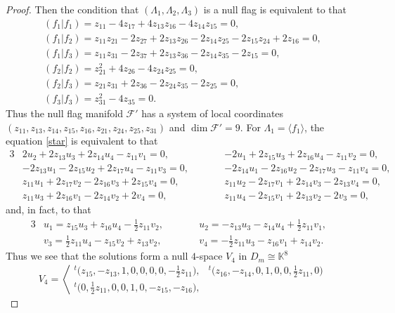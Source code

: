 \documentclass[11pt]{article}
\numberwithin{equation}{section}
\numberwithin{equation}{section}
\theoremstyle{definition}
\newcommand{\KK}{\mathbb{K}}
\newcommand{\0}{\boldsymbol{0}}
\begin{document}
\begin{proof}
Then the condition that $(\Lambda_1, \Lambda_2, \Lambda_3)$ is a null flag is equivalent to that
\begin{gather*}
(f_1 \vert f_1) = z_{11} - 4z_{17} + 4z_{13}z_{16} - 4z_{14}z_{15} = 0,
\\
(f_1 \vert f_2) = z_{11}z_{21} - 2z_{27} + 2z_{13}z_{26} - 2z_{14}z_{25} - 2z_{15}z_{24} + 2z_{16} = 0,
\\
(f_1 \vert f_3) = z_{11}z_{31} - 2z_{37} + 2z_{13}z_{36} - 2z_{14}z_{35} - 2z_{15} = 0,
\\
(f_2 \vert f_2) = z_{21}^2 + 4z_{26} - 4z_{24}z_{25} = 0,
\\
(f_2 \vert f_3) = z_{21}z_{31} + 2z_{36} - 2z_{24}z_{35} - 2z_{25} = 0,
\\
(f_3 \vert f_3) = z_{31}^2 - 4z_{35} = 0.
\end{gather*}
Thus the null flag manifold ${\mathcal F}'$ has a system of local coordinates $(z_{11}, z_{13}, z_{14}, z_{15}, z_{16}, z_{21}, z_{24},\allowbreak z_{25}, z_{31})$ and $\dim {\mathcal F}' = 9$.
For $\Lambda_1 = \langle f_1\rangle$, the equation \eqref{star} is equivalent to that
\begin{alignat*}{3}
&2u_2 + 2z_{13}u_3 + 2z_{14}u_4 - z_{11}v_1 = 0,
\qquad&&
-2u_1 + 2z_{15}u_3 + 2z_{16}u_4 - z_{11}v_2 = 0,&
\\
&-2z_{13}u_1 - 2z_{15}u_2 + 2z_{17}u_4 - z_{11}v_3 = 0,
\qquad&&
-2z_{14}u_1 - 2z_{16}u_2 - 2z_{17}u_3 - z_{11}v_4 = 0,&
\\
&z_{11}u_1 + 2z_{17}v_2 - 2z_{16}v_3 + 2z_{15}v_4 = 0,
\qquad&&
z_{11}u_2 - 2z_{17}v_1 + 2z_{14}v_3 - 2z_{13}v_4 = 0,&
\\
&z_{11}u_3 + 2z_{16}v_1 - 2z_{14}v_2 + 2v_4 = 0,
\qquad&&
z_{11}u_4 - 2z_{15}v_1 + 2z_{13}v_2 - 2v_3 = 0,&
\end{alignat*}
and, in fact, to that
\begin{alignat*}{3}
&u_1 = z_{15}u_3 + z_{16}u_4 - \frac{1}{2}z_{11}v_2, \qquad&&
u_2 = -z_{13}u_3 - z_{14}u_4 + \frac{1}{2}z_{11}v_1,&
\\
&v_3 = \frac{1}{2}z_{11}u_4 - z_{15}v_2 + z_{13}v_2, \qquad&&
v_4 = - \frac{1}{2}z_{11}u_3 - z_{16}v_1 + z_{14}v_2.&
\end{alignat*}
Thus we see that the solutions form a null $4$-space $V_4$ in $D_m \cong \KK^8$
\[
V_4 = \left\langle
\begin{matrix}
{}^t\bigl(z_{15}, - z_{13}, 1, 0, 0, 0, 0, - \frac{1}{2}z_{11}\bigr), &
{}^t\bigl(z_{16}, - z_{14}, 0, 1, 0, 0, \frac{1}{2}z_{11}, 0\bigr)
\\
{}^t\bigl(0, \frac{1}{2}z_{11}, 0, 0, 1, 0, - z_{15}, - z_{16}\bigr), &

\end{matrix}\]
\end{proof}
\end{document}
